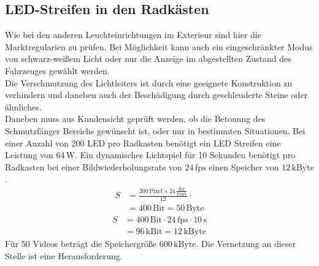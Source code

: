 \subsection{LED-Streifen in den Radkästen}
Wie bei den anderen Leuchteinrichtungen im Exterieur sind hier die Marktregularien zu prüfen. Bei Möglichkeit kann auch ein eingeschränkter Modus von schwarz-weißem Licht oder nur die Anzeige im abgestellten Zustand des Fahrzeuges gewählt werden. \\
Die Verschmutzung des Lichtleiters ist durch eine geeignete Konstruktion zu verhindern und daneben auch der Beschädigung durch geschleuderte Steine oder ähnliches. \\
Daneben muss aus Kundensicht geprüft werden, ob die Betonung des Schmutzfänger Bereichs gewünscht ist, oder nur in bestimmten Situationen.
Bei einer Anzahl von 200 LED pro Radkasten benötigt ein LED Streifen eine Leistung von $ 64\,\mathrm{W} $.
Ein dynamisches Lichtspiel für 10 Sekunden benötigt pro Radkasten bei einer Bildwiederholungsrate von $ 24\,\mathrm{fps} $ einen Speicher von $ 12\,\mathrm{kByte}$. \\
\begin{align}
	S &= \frac{200\,\mathrm{Pixel} \times 24\,\frac{\mathrm{Bit}}{\mathrm{Pixel}}}{12} \cdot \\
	&= 400\,\mathrm{Bit} = 50\,\mathrm{Byte}
\end{align}
\begin{align}
	S &= 400\,\mathrm{Bit} \cdot 24\,\mathrm{fps} \cdot 10\,\mathrm{s}\\
	&= 96\,\mathrm{kBit} = 12\,\mathrm{kByte}
\end{align}
Für 50 Videos beträgt die Speichergröße $ 600\,\mathrm{kByte} $.
Die Vernetzung an dieser Stelle ist eine Herausforderung.
